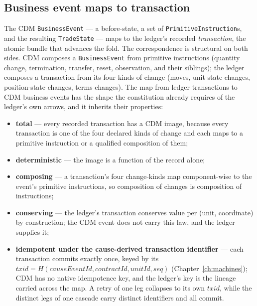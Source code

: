 \subsection{Business event maps to transaction}

The CDM \texttt{BusinessEvent} --- a before-state, a set of
\texttt{PrimitiveInstruction}s, and the resulting \texttt{TradeState} --- maps to
the ledger's recorded \emph{transaction}, the atomic bundle that advances the
fold. The correspondence is structural on both sides. CDM composes a
\texttt{BusinessEvent} from primitive instructions (quantity change,
termination, transfer, reset, observation, and their siblings); the ledger
composes a transaction from its four kinds of change (moves, unit-state changes,
position-state changes, terms changes). The map from ledger transactions to CDM
business events has the shape the constitution already requires of the ledger's
own arrows, and it inherits their properties:

\begin{itemize}[nosep,leftmargin=1.4em]
  \item \textbf{total} --- every recorded transaction has a CDM image, because
        every transaction is one of the four declared kinds of change and each
        maps to a primitive instruction or a qualified composition of them;
  \item \textbf{deterministic} --- the image is a function of the record alone;
  \item \textbf{composing} --- a transaction's four change-kinds map
        component-wise to the event's primitive instructions, so composition of
        changes is composition of instructions;
  \item \textbf{conserving} --- the ledger's transaction conserves value per
        (unit, coordinate) by construction; the CDM event does not carry this
        law, and the ledger supplies it;
  \item \textbf{idempotent under the cause-derived transaction identifier} --- each
        transaction commits exactly once, keyed by its
        $\mathit{txid}=H(\mathit{causeEventId},\mathit{contractId},\mathit{unitId},\mathit{seq})$
        (Chapter~\ref{ch:machines}); CDM has no native idempotence key, and the
        ledger's key is the lineage carried across the map. A retry of one leg
        collapses to its own $\mathit{txid}$, while the distinct legs of one cascade
        carry distinct identifiers and all commit.
\end{itemize}

